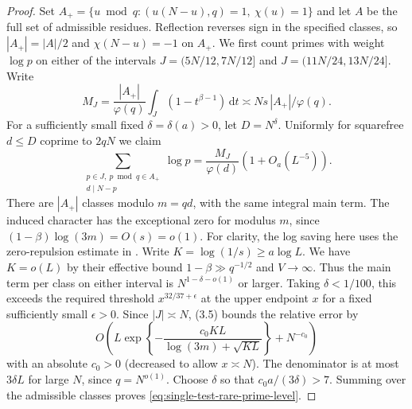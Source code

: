 \documentclass[11pt,a4paper]{article}
\numberwithin{equation}{section}
\newcommand{\ud}{\mathrm d}
\begin{document}
\begin{proof}
Set $A_+=\{u\bmod q:(u(N-u),q)=1,\ \chi(u)=1\}$ and let
$A$ be the full set of admissible residues. Reflection reverses
sign in the specified classes, so $|A_+|=|A|/2$ and
$\chi(N-u)=-1$ on $A_+$. We first count primes with weight
$\log p$ on either of the intervals $J=(5N/12,7N/12]$ and
$J=(11N/24,13N/24]$. Write
\[
 M_J=\frac{|A_+|}{\varphi(q)}\int_J(1-t^{\beta-1})\,\ud t
       \asymp Ns\,|A_+|/\varphi(q).
\]
For a sufficiently small fixed $\delta=\delta(a)>0$, let
$D=N^\delta$. Uniformly for squarefree $d\le D$ coprime to
$2qN$ we claim
\begin{equation}
 \sum_{\substack{p\in J,\ p\bmod q\in A_+\\ d\mid N-p}}\log p
   =\frac{M_J}{\varphi(d)}(1+O_a(L^{-5})).
 \label{eq:single-test-rare-prime-level}
\end{equation}
There are $|A_+|$ classes modulo $m=qd$, with the same integral
main term. The induced character has the exceptional zero for
modulus $m$, since $(1-\beta)\log(3m)=O(s)=o(1)$.
For clarity, the log saving here uses the zero-repulsion estimate
in \cite[Theorem~2.3 and (3.5)]{ThornerZamanAP}. Write
$K=\log(1/s)\ge a\log L$. We have $K=o(L)$ by their effective
bound $1-\beta\gg q^{-1/2}$ and $V\to\infty$. Thus the main
term per class on either interval is $N^{1-\delta-o(1)}$ or
larger. Taking $\delta<1/100$, this exceeds the required threshold
$x^{32/37+\epsilon}$ at the upper endpoint $x$ for a fixed
sufficiently small $\epsilon>0$. Since $|J|\asymp N$, (3.5)
bounds the relative error by
\[
 O\!\left(L\exp\left\{-\frac{c_0 KL}
   {\log(3m)+\sqrt{KL}}\right\}+N^{-c_0}\right)
\]
with an absolute $c_0>0$ (decreased to allow $x\asymp N$).
The denominator is at most $3\delta L$ for large $N$, since
$q=N^{o(1)}$. Choose $\delta$ so that $c_0 a/(3\delta)>7$.
Summing over the admissible classes proves
\eqref{eq:single-test-rare-prime-level}.


\end{proof}
\end{document}
